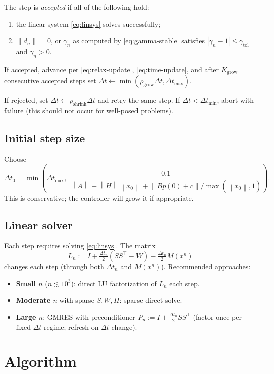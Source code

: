 \documentclass[11pt]{article}
\theoremstyle{definition}
\newcommand{\norm}[1]{\left\|#1\right\|}
\newcommand{\dt}{\Delta t}
\begin{document}
\noindent The step is \emph{accepted} if all of the following hold:
\begin{enumerate}[label=(\alph*), leftmargin=*]
    \item the linear system \eqref{eq:linsys} solves successfully;
    \item $\norm{d_n} = 0$, or $\gamma_n$ as computed by \eqref{eq:gamma-stable} satisfies $|\gamma_n - 1| \le \gamma_{\text{tol}}$ and $\gamma_n > 0$.
\end{enumerate}

If accepted, advance per \eqref{eq:relax-update}, \eqref{eq:time-update}, and after $K_{\text{grow}}$ consecutive accepted steps set $\dt \leftarrow \min(\rho_{\text{grow}} \dt, \dt_{\max})$.

If rejected, set $\dt \leftarrow \rho_{\text{shrink}} \dt$ and retry the same step. If $\dt < \dt_{\min}$, abort with failure (this should not occur for well-posed problems).

\subsection{Initial step size}

Choose
\[
\dt_0 = \min\!\left(\dt_{\max}, \; \frac{0.1}{\norm{A} + \norm{H} \norm{x_0} + \norm{B p(0) + c} / \max(\norm{x_0}, 1)}\right).
\]
This is conservative; the controller will grow it if appropriate.

\subsection{Linear solver}

Each step requires solving \eqref{eq:linsys}. The matrix
\[
L_n := I + \tfrac{\dt_n}{2}(SS^\top - W) - \tfrac{\dt_n}{2} M(x^n)
\]
changes each step (through both $\dt_n$ and $M(x^n)$). Recommended approaches:
\begin{itemize}[leftmargin=*]
    \item \textbf{Small $n$} ($n \lesssim 10^3$): direct LU factorization of $L_n$ each step.
    \item \textbf{Moderate $n$} with sparse $S, W, H$: sparse direct solve.
    \item \textbf{Large $n$}: GMRES with preconditioner $P_n := I + \tfrac{\dt_n}{2} SS^\top$ (factor once per fixed-$\dt$ regime; refresh on $\dt$ change).
\end{itemize}

\section{Algorithm}
\end{document}
